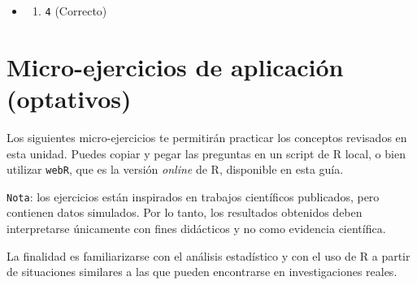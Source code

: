 \documentclass[
  spanish,
  letterpaper,
  DIV=11,
  numbers=noendperiod]{scrreprt}
\providecommand{\tightlist}{%
  \setlength{\itemsep}{0pt}\setlength{\parskip}{0pt}}
\begin{document}
\begin{itemize}
\tightlist
\item
  \begin{enumerate}
  \def\labelenumi{\alph{enumi})}
  \setcounter{enumi}{3}
  \tightlist
  \item
    \texttt{4} (Correcto)
  \end{enumerate}
\end{itemize}

\section{Micro-ejercicios de aplicación
(optativos)}\label{micro-ejercicios-de-aplicaciuxf3n-optativos-3}

Los siguientes micro-ejercicios te permitirán practicar los conceptos
revisados en esta unidad. Puedes copiar y pegar las preguntas en un
script de R local, o bien utilizar \texttt{webR}, que es la versión
\emph{online} de R, disponible en esta guía.

\texttt{Nota}: los ejercicios están inspirados en trabajos científicos
publicados, pero contienen datos simulados. Por lo tanto, los resultados
obtenidos deben interpretarse únicamente con fines didácticos y no como
evidencia científica.

La finalidad es familiarizarse con el análisis estadístico y con el uso
de R a partir de situaciones similares a las que pueden encontrarse en
investigaciones reales.
\end{document}
